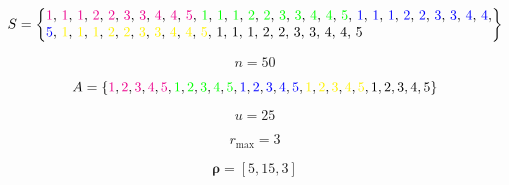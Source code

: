 \documentclass{article}
\begin{document}
\begin{equation}\nonumber
    S = \left \{\\
    \parbox{32em}{
     \color{magenta}1\color{black}, \color{magenta}1\color{black}, \color{magenta}1\color{black}, \color{magenta}2\color{black}, \color{magenta}2\color{black}, \color{magenta}3\color{black}, \color{magenta}3\color{black}, \color{magenta}4\color{black}, \color{magenta}4\color{black}, \color{magenta}5\color{black}, \color{green}1\color{black}, \color{green}1\color{black}, \color{green}1\color{black}, \color{green}2\color{black}, \color{green}2\color{black}, \color{green}3\color{black}, \color{green}3\color{black}, \color{green}4\color{black}, \color{green}4\color{black}, \color{green}5\color{black}, \color{blue}1\color{black}, \color{blue}1\color{black}, \color{blue}1\color{black}, \color{blue}2\color{black}, \color{blue}2\color{black}, \color{blue}3\color{black}, \color{blue}3\color{black}, \color{blue}4\color{black}, \color{blue}4\color{black}, \color{blue}5\color{black}, \color{yellow}1\color{black}, \color{yellow}1\color{black}, \color{yellow}1\color{black}, \color{yellow}2\color{black}, \color{yellow}2\color{black}, \color{yellow}3\color{black}, \color{yellow}3\color{black}, \color{yellow}4\color{black}, \color{yellow}4\color{black}, \color{yellow}5\color{black}, 1, 1, 1, 2, 2, 3, 3, 4, 4, 5
     }\right \}
\end{equation}

\begin{equation}\nonumber
    n = 50
\end{equation}

\begin{equation}\nonumber
    A = \left \{
     \color{magenta}1\color{black}, \color{magenta}2\color{black}, \color{magenta}3\color{black},  \color{magenta}4\color{black}, \color{magenta}5\color{black}, \color{green}1\color{black}, \color{green}2\color{black}, \color{green}3\color{black},  \color{green}4\color{black}, \color{green}5\color{black}, \color{blue}1\color{black}, \color{blue}2\color{black}, \color{blue}3\color{black}, \color{blue}4\color{black}, \color{blue}5\color{black}, \color{yellow}1\color{black}, \color{yellow}2\color{black},  \color{yellow}3\color{black}, \color{yellow}4\color{black}, \color{yellow}5\color{black}, 1, 2, 3, 4, 5\right \}
\end{equation}

\begin{equation}\nonumber
    u = 25
\end{equation}

\begin{equation}\nonumber
    r_{\max} = 3
\end{equation}

\begin{equation}\nonumber
    \bm{\rho} = [5, 15, 3]
\end{equation}



\end{document}
